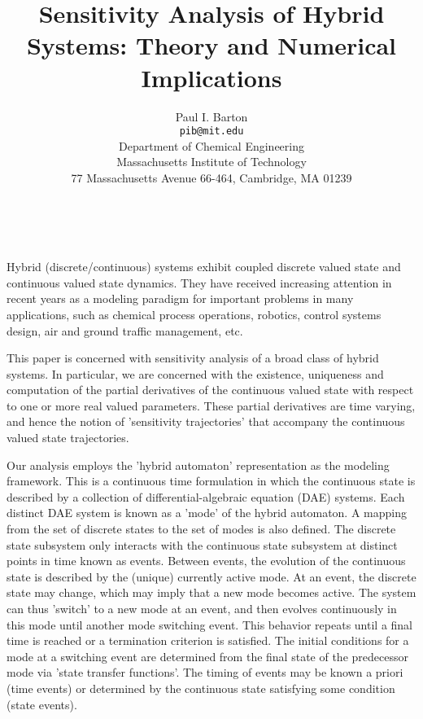 \documentclass[11pt]{article}
\date{ ~ \hspace{-4mm}}
\title{Sensitivity Analysis of Hybrid Systems: Theory and Numerical Implications  }
\author{Paul I. Barton \\ {\tt pib@mit.edu} \\ Department of Chemical Engineering  \\  Massachusetts Institute of Technology  \\  77 Massachusetts Avenue 66-464, Cambridge, MA 01239}
\begin{document}
\maketitle
\thispagestyle{empty}





 



Hybrid (discrete/continuous) systems exhibit coupled discrete valued state and continuous valued state dynamics. They have received increasing attention in recent years as a modeling paradigm for important problems in many applications, such as chemical process operations, robotics, control systems design, air and ground traffic management, etc.  



This paper is concerned with sensitivity analysis of a broad class of hybrid systems. In particular, we are concerned with the existence, uniqueness and computation of the partial derivatives of the continuous valued state with respect to one or more real valued parameters. These partial derivatives are time varying, and hence the notion of 'sensitivity trajectories' that accompany the continuous valued state trajectories. 



Our analysis employs the 'hybrid automaton' representation as the modeling framework. This is a continuous time formulation in which the continuous state is described by a collection of differential-algebraic equation (DAE) systems. Each distinct DAE system is known as a 'mode' of the hybrid automaton. A mapping from the set of discrete states to the set of modes is also defined. The discrete state subsystem only interacts with the continuous state subsystem at distinct points in time known as events. Between events, the evolution of the continuous state is described by the (unique) currently active mode. At an event, the discrete state may change, which may imply that a new mode becomes active. The system can thus 'switch' to a new mode at an event, and then evolves continuously in this mode until another mode switching event. This behavior repeats until a final time is reached or a termination criterion is satisfied. The initial conditions for a mode at a switching event are determined from the final state of the predecessor mode via 'state transfer functions'. The timing of events may be known a priori (time events) or determined by the continuous state satisfying some condition (state events).
\end{document}
